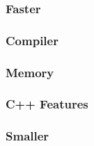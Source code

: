 \documentclass{beamer}
\begin{document}
\begin{frame}
\frametitle{Faster}


\end{frame}


\begin{frame}
\frametitle{Compiler}

\end{frame}

\begin{frame}
\frametitle{Memory}

\end{frame}

\begin{frame}
\frametitle{C++ Features}


\end{frame}



\begin{frame}
\frametitle{Smaller}


\end{frame}
\end{document}
